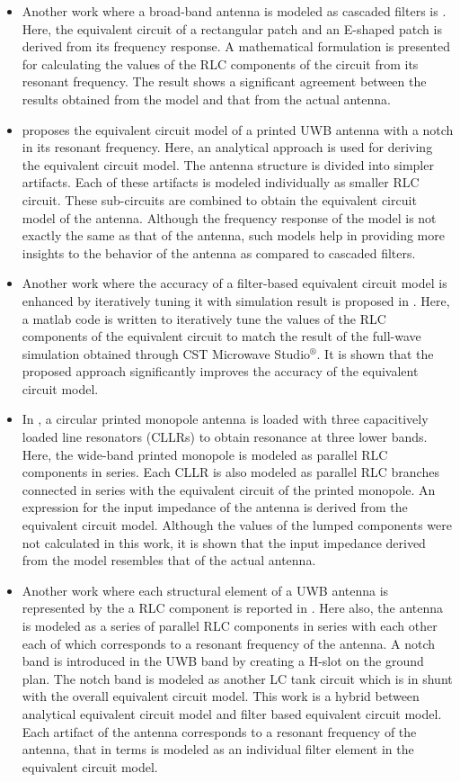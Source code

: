 \begin{itemize}
\item Another work where a broad-band antenna is modeled as cascaded filters is \cite{rectEqCkt}. Here, the equivalent circuit of a rectangular patch and an E-shaped patch is derived from its frequency response. A mathematical formulation is presented for calculating the values of the RLC components of the circuit from its resonant frequency. The result shows a significant agreement between the results obtained from the model and that from the actual antenna.
\item \cite{UwbNotchEqCkt} proposes the equivalent circuit model of a printed UWB antenna with a notch in its resonant frequency. Here, an analytical approach is used for deriving the equivalent circuit model. The antenna structure is divided into simpler artifacts. Each of these artifacts is modeled individually as smaller RLC circuit. These sub-circuits are combined to obtain the equivalent circuit model of the antenna. Although the frequency response of the model is not exactly the same as that of the antenna, such models help in providing more insights to the behavior of the antenna as compared to cascaded filters.
\item Another work where the accuracy of a filter-based equivalent circuit model is enhanced by iteratively tuning it with simulation result is proposed in \cite{UwbPmaEqCkt2}. Here, a matlab code is written to iteratively tune the values of the RLC components of the equivalent circuit to match the result of the full-wave simulation obtained through CST Microwave Studio$^{\circledR}$. It is shown that the proposed approach significantly improves the accuracy of the equivalent circuit model.
\item In \cite{UwbPmaEqCkt3}, a circular printed monopole antenna is loaded with three capacitively loaded line resonators (CLLRs) to obtain resonance at three lower bands. Here, the wide-band printed monopole is modeled as parallel RLC components in series. Each CLLR is also modeled as parallel RLC branches connected in series with the equivalent circuit of the printed monopole. An expression for the input impedance of the antenna is derived from the equivalent circuit model. Although the values of the lumped components were not calculated in this work, it is shown that the input impedance derived from the model resembles that of the actual antenna.
\item Another work where each structural element of a UWB antenna is represented by the a RLC component is reported in \cite{UwbPmaEqCkt4}. Here also, the antenna is modeled as a series of parallel RLC components in series with each other each of which corresponds to a resonant frequency of the antenna. A notch band is introduced in the UWB band by creating a H-slot on the ground plan. The notch band is modeled as another LC tank circuit which is in shunt with the overall equivalent circuit model. This work is a hybrid between analytical equivalent circuit model and filter based equivalent circuit model. Each artifact of the antenna corresponds to a resonant frequency of the antenna, that in terms is modeled as an individual filter element in the equivalent circuit model.

\end{itemize}
